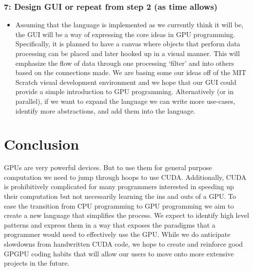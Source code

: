 \documentclass{article}
\begin{document}
\subsubsection*{7: Design GUI or repeat from step 2 (as time allows)}
\begin{itemize}
  \item Assuming that the language is implemented as we currently think it will be, the GUI will be a way of expressing the core ideas in GPU programming. Specifically, it is planned to have a canvas where objects that perform data processing can be placed and later hooked up in a visual manner. This will emphasize the flow of data through one processing `filter' and into others based on the connections made. We are basing some our ideas off of the MIT Scratch visual development environment and we hope that our GUI could provide a simple introduction to GPU programming. Alternatively (or in parallel), if we want to expand the language we can write more use-cases, identify more abstractions, and add them into the language.
\end{itemize}

\section{Conclusion}

GPUs are very powerful devices. But to use them for general purpose computation we need to jump through hoops to use CUDA. Additionally, CUDA is prohibitively complicated for many programmers interested in speeding up their computation but not necessarily learning the ins and outs of a GPU. To ease the transition from CPU programming to GPU programming we aim to create a new language that simplifies the process. We expect to identify high level patterns and express them in a way that exposes the paradigms that a programmer would need to effectively use the GPU. While we do anticipate slowdowns from handwritten CUDA code, we hope to create and reinforce good GPGPU coding habits that will allow our users to move onto more extensive projects in the future.




\end{document}
